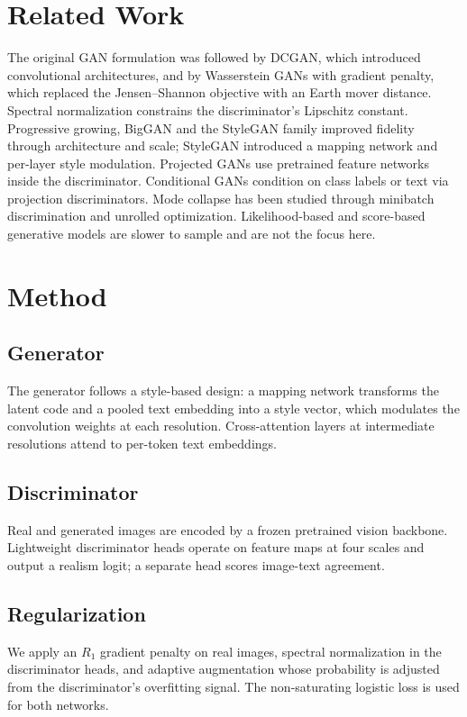 \documentclass{article}
\begin{document}
\section{Related Work}
The original GAN formulation was followed by DCGAN, which introduced
convolutional architectures, and by Wasserstein GANs with gradient penalty,
which replaced the Jensen--Shannon objective with an Earth mover distance.
Spectral normalization constrains the discriminator's Lipschitz constant.
Progressive growing, BigGAN and the StyleGAN family improved fidelity through
architecture and scale; StyleGAN introduced a mapping network and per-layer
style modulation. Projected GANs use pretrained feature networks inside the
discriminator. Conditional GANs condition on class labels or text via
projection discriminators. Mode collapse has been studied through minibatch
discrimination and unrolled optimization. Likelihood-based and score-based
generative models are slower to sample and are not the focus here.

\section{Method}
\subsection{Generator}
The generator follows a style-based design: a mapping network transforms the
latent code and a pooled text embedding into a style vector, which modulates
the convolution weights at each resolution. Cross-attention layers at
intermediate resolutions attend to per-token text embeddings.

\subsection{Discriminator}
Real and generated images are encoded by a frozen pretrained vision backbone.
Lightweight discriminator heads operate on feature maps at four scales and
output a realism logit; a separate head scores image-text agreement.

\subsection{Regularization}
We apply an $R_1$ gradient penalty on real images, spectral normalization in
the discriminator heads, and adaptive augmentation whose probability is
adjusted from the discriminator's overfitting signal. The non-saturating
logistic loss is used for both networks.
\end{document}
